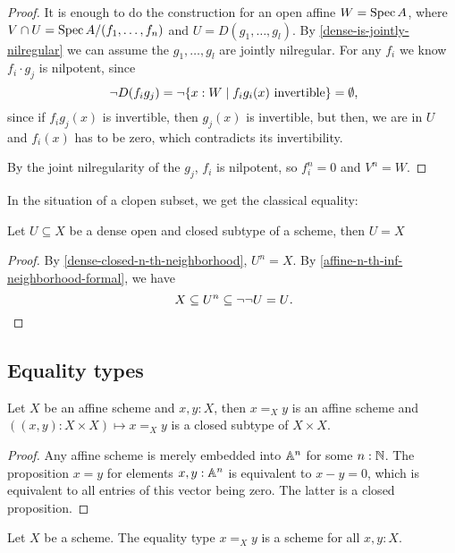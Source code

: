 \begin{proof}
  It is enough to do the construction for an open affine $W=\operatorname{Spec} A$,
  where $V\cap U=\operatorname{Spec} A/(f_1,\dots,f_n)$ and
  $U=D(g_1,\dots,g_l)$.
  By \cref{dense-is-jointly-nilregular} we can assume the $g_1,\dots,g_l$
  are jointly nilregular.
  For any $f_i$ we know $f_i\cdot g_j$ is nilpotent, since
  \[ \neg D(f_ig_j)=\neg\{x:W\mid f_ig_i(x)\text{ invertible}\} =\emptyset\rlap{,}\]
  since if $f_ig_j(x)$ is invertible, then $g_j(x)$ is invertible, but then, we are in
  $U$ and $f_i(x)$ has to be zero, which contradicts its invertibility.

  By the joint nilregularity of the $g_j$, $f_i$ is nilpotent,
  so $f_i^n=0$ and $V^n=W$.
\end{proof}

In the situation of a clopen subset, we get the classical equality:

\begin{lemma}%
  \label{clopen-dense-is-all}
  Let $U\subseteq X$ be a dense open and closed subtype of a scheme,
  then $U=X$
\end{lemma}

\begin{proof}
  By \cref{dense-closed-n-th-neighborhood},
  $U^n=X$.
  By \cref{affine-n-th-inf-neighborhood-formal}, we have
  \[
    X\subseteq U^n\subseteq \neg\neg U = U\rlap{.}
  \]
\end{proof}

\subsection{Equality types}

\begin{lemma}%
  \label{affine-equality-closed}
  Let $X$ be an affine scheme and $x,y:X$,
  then $x=_Xy$ is an affine scheme
  and $((x,y):X\times X)\mapsto x=_Xy$
  is a closed subtype of $X\times X$.
\end{lemma}

\begin{proof}
  Any affine scheme is merely embedded into $\mathbb{A}^n$ for some $n:\mathbb{N}$.
  The proposition $x=y$ for elements $x,y:\mathbb{A}^n$ is equivalent to $x-y=0$,
  which is equivalent to all entries of this vector being zero.
  The latter is a closed proposition.
\end{proof}

\begin{proposition}%
  \label{equality-scheme}
  Let $X$ be a scheme.
  The equality type $x=_Xy$ is a scheme for all $x,y:X$.
\end{proposition}

